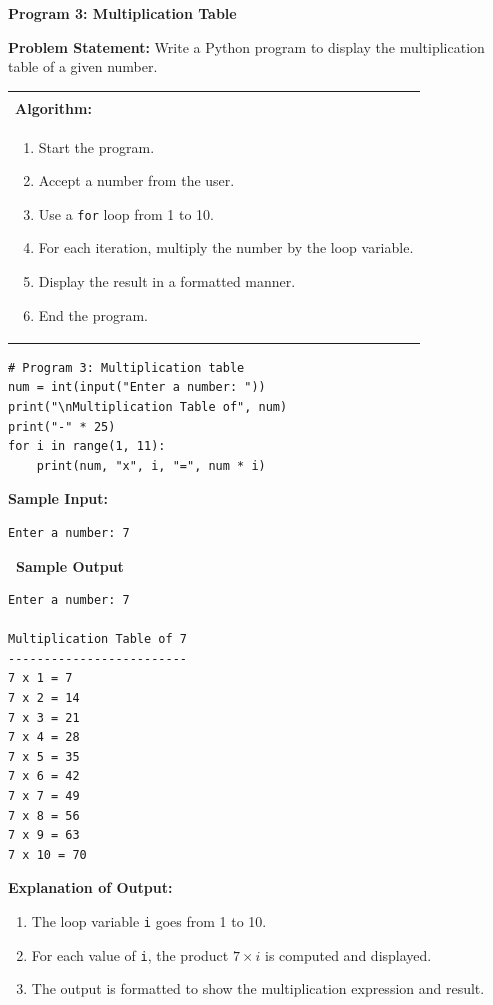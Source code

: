 \documentclass[12pt,a4paper]{article}
\makeatletter
\newcommand{\outhead}{\noindent\colorbox{cmrgreen!25}%
  {\textbf{\small\color{cmrdark}~Sample Output~}}\par\vspace{-1pt}}
\newenvironment{algobox}{%
  \par\vspace{4pt}%
  \noindent\begin{tabular}{@{}p{\linewidth}@{}}%
  \hline\\[-8pt]%
  \textbf{\color{blue!60!black}\small Algorithm:}\\[2pt]%
}{%
  \\[-4pt]\hline%
  \end{tabular}\par\vspace{4pt}%
}
\makeatother
\begin{document}
\textbf{Program 3: Multiplication Table}

\textbf{Problem Statement:}
Write a Python program to display the multiplication table of a given number.

\begin{algobox}
\begin{enumerate}[label=Step \arabic*:]
  \item Start the program.
  \item Accept a number from the user.
  \item Use a \texttt{for} loop from 1 to 10.
  \item For each iteration, multiply the number by the loop variable.
  \item Display the result in a formatted manner.
  \item End the program.
\end{enumerate}
\end{algobox}

\begin{lstlisting}
# Program 3: Multiplication table
num = int(input("Enter a number: "))
print("\nMultiplication Table of", num)
print("-" * 25)
for i in range(1, 11):
    print(num, "x", i, "=", num * i)
\end{lstlisting}

\textbf{Sample Input:}
\begin{verbatim}
Enter a number: 7
\end{verbatim}

\outhead
\begin{lstlisting}[style=outputstyle]
Enter a number: 7

Multiplication Table of 7
-------------------------
7 x 1 = 7
7 x 2 = 14
7 x 3 = 21
7 x 4 = 28
7 x 5 = 35
7 x 6 = 42
7 x 7 = 49
7 x 8 = 56
7 x 9 = 63
7 x 10 = 70
\end{lstlisting}

\textbf{Explanation of Output:}
\begin{enumerate}
  \item The loop variable \texttt{i} goes from 1 to 10.
  \item For each value of \texttt{i}, the product $7 \times i$ is computed and displayed.
  \item The output is formatted to show the multiplication expression and result.
\end{enumerate}

\vspace{0.5cm}
\end{document}
